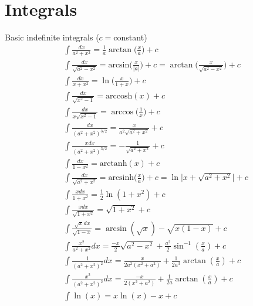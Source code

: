 \chapter{Integrals}
\thispagestyle{fancy}
Basic indefinite integrals ($c=$constant)
\begin{align}
	&\int \frac{dx}{a^2+x^2} = \frac{1}{a}\arctan\bigg(\frac{x}{a}\bigg) +c\\
	&\int \frac{dx}{\sqrt{a^2-x^2}}= \textrm{arcsin}\bigg(\frac{x}{|a|} \bigg)+c =\arctan\bigg(\frac{x}{\sqrt{a^2-x^2}} \bigg)+c\\
	&\int \frac{dx}{x+x^2} =\ln\bigg(\frac{x}{1+x} \bigg) +c\\
	&\int \frac{dx}{\sqrt{x^2-1}}= \textrm{arccosh}(x) +c\\
	&\int \frac{dx}{x\sqrt{x^2-1}}= \arccos\bigg(\frac{1}{x}\bigg)+c \\
	&\int \frac{dx}{(a^2+x^2)^{3/2}} = \frac{x}{a^2\sqrt{a^2+x^2}} +c\\
	&\int \frac{xdx}{(a^2+x^2)^{3/2}} = -\frac{1}{\sqrt{a^2+x^2}} +c\\
	&\int \frac{dx}{1-x^2} = \textrm{arctanh}(x) +c\\
	&\int \frac{dx}{\sqrt{a^2+x^2}} = \textrm{arcsinh}\bigg(\frac{x}{a}\bigg) +c = \ln\big|x+\sqrt{a^2+x^2}\big|+c\\
	&\int \frac{xdx}{1+x^2} =\frac{1}{2}\ln(1+x^2) +c\\
	&\int \frac{xdx}{\sqrt{1+x^2}}= \sqrt{1+x^2} +c\\
	&\int \frac{\sqrt{x}dx}{\sqrt{1-x}}= \arcsin(\sqrt{x})-\sqrt{x(1-x)} +c\\
	&\int \frac{x^2}{a^2+x^2} dx=\frac{-x}{2}\sqrt{a^2-x^2}+\frac{a^2}{2}\sin^{-1}\left(\frac{x}{a}\right)+c\\
	&\int \frac{1}{(a^2+x^2)^2}dx = \frac{x}{2a^2(x^2+a^2)}+\frac{1}{2a^3}\arctan\left(\frac{x}{a}\right) +c \\
	&\int \frac{x^2}{(a^2+x^2)^2}dx = \frac{-x}{2(x^2+a^2)}+\frac{1}{2a}\arctan\left(\frac{x}{a}\right) +c \\
	&\int \ln(x)=x\ln(x)-x+c 
\end{align}


\newpage

